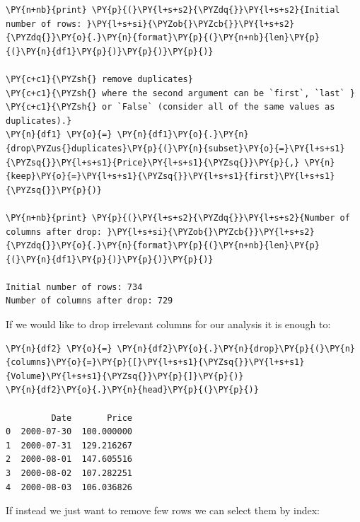 \begin{tcolorbox}[breakable, size=fbox, boxrule=1pt, pad at break*=1mm,colback=cellbackground, colframe=cellborder]
\begin{Verbatim}[commandchars=\\\{\}]
\PY{n+nb}{print} \PY{p}{(}\PY{l+s+s2}{\PYZdq{}}\PY{l+s+s2}{Initial number of rows: }\PY{l+s+si}{\PYZob{}\PYZcb{}}\PY{l+s+s2}{\PYZdq{}}\PY{o}{.}\PY{n}{format}\PY{p}{(}\PY{n+nb}{len}\PY{p}{(}\PY{n}{df1}\PY{p}{)}\PY{p}{)}\PY{p}{)} 

\PY{c+c1}{\PYZsh{} remove duplicates}
\PY{c+c1}{\PYZsh{} where the second argument can be `first`, `last` }
\PY{c+c1}{\PYZsh{} or `False` (consider all of the same values as duplicates).}
\PY{n}{df1} \PY{o}{=} \PY{n}{df1}\PY{o}{.}\PY{n}{drop\PYZus{}duplicates}\PY{p}{(}\PY{n}{subset}\PY{o}{=}\PY{l+s+s1}{\PYZsq{}}\PY{l+s+s1}{Price}\PY{l+s+s1}{\PYZsq{}}\PY{p}{,} \PY{n}{keep}\PY{o}{=}\PY{l+s+s1}{\PYZsq{}}\PY{l+s+s1}{first}\PY{l+s+s1}{\PYZsq{}}\PY{p}{)}

\PY{n+nb}{print} \PY{p}{(}\PY{l+s+s2}{\PYZdq{}}\PY{l+s+s2}{Number of columns after drop: }\PY{l+s+si}{\PYZob{}\PYZcb{}}\PY{l+s+s2}{\PYZdq{}}\PY{o}{.}\PY{n}{format}\PY{p}{(}\PY{n+nb}{len}\PY{p}{(}\PY{n}{df1}\PY{p}{)}\PY{p}{)}\PY{p}{)}

Initial number of rows: 734
Number of columns after drop: 729
\end{Verbatim}
\end{tcolorbox}

If we would like to drop irrelevant columns for our analysis it is enough to:

\begin{tcolorbox}[breakable, size=fbox, boxrule=1pt, pad at break*=1mm,colback=cellbackground, colframe=cellborder]
\begin{Verbatim}[commandchars=\\\{\}]
\PY{n}{df2} \PY{o}{=} \PY{n}{df2}\PY{o}{.}\PY{n}{drop}\PY{p}{(}\PY{n}{columns}\PY{o}{=}\PY{p}{[}\PY{l+s+s1}{\PYZsq{}}\PY{l+s+s1}{Volume}\PY{l+s+s1}{\PYZsq{}}\PY{p}{]}\PY{p}{)}
\PY{n}{df2}\PY{o}{.}\PY{n}{head}\PY{p}{(}\PY{p}{)}

         Date       Price
0  2000-07-30  100.000000
1  2000-07-31  129.216267
2  2000-08-01  147.605516
3  2000-08-02  107.282251
4  2000-08-03  106.036826
\end{Verbatim}
\end{tcolorbox}
        
If instead we just want to remove few rows we can select them by index:

